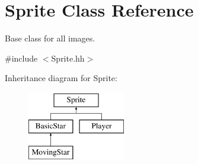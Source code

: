 \hypertarget{classSprite}{\section{Sprite Class Reference}
\label{classSprite}
}


Base class for all images.  




{\ttfamily \#include $<$Sprite.\-hh$>$}

Inheritance diagram for Sprite\-:\begin{figure}[H]
\begin{center}
\leavevmode
\includegraphics[height=3.000000cm]{classSprite}
\end{center}
\end{figure}
